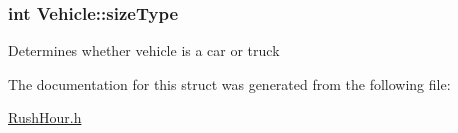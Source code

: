 \subsubsection[{\texorpdfstring{size\+Type}{sizeType}}]{\setlength{\rightskip}{0pt plus 5cm}int Vehicle\+::size\+Type}\hypertarget{struct_vehicle_a79b518cc24d1483c305d3b7e67a621ab}{}\label{struct_vehicle_a79b518cc24d1483c305d3b7e67a621ab}
Determines whether vehicle is a car or truck 

The documentation for this struct was generated from the following file\+:\begin{DoxyCompactItemize}
\item 
\hyperlink{_rush_hour_8h}{Rush\+Hour.\+h}\end{DoxyCompactItemize}
